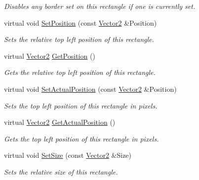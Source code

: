 \begin{DoxyCompactItemize}
\begin{DoxyCompactList}\small\item\em Disables any border set on this rectangle if one is currently set. \item\end{DoxyCompactList}\item 
virtual void \hyperlink{classphys_1_1UI_1_1Rectangle_a16fd918d53d0ae1f82af2574c0396b2c}{SetPosition} (const \hyperlink{classphys_1_1Vector2}{Vector2} \&Position)
\begin{DoxyCompactList}\small\item\em Sets the relative top left position of this rectangle. \item\end{DoxyCompactList}\item 
virtual \hyperlink{classphys_1_1Vector2}{Vector2} \hyperlink{classphys_1_1UI_1_1Rectangle_aa0e2d6170f0b2d5b1f915c705e7fca10}{GetPosition} ()
\begin{DoxyCompactList}\small\item\em Gets the relative top left position of this rectangle. \item\end{DoxyCompactList}\item 
virtual void \hyperlink{classphys_1_1UI_1_1Rectangle_a8a5af1cc3360196f793deb8a0db604e4}{SetActualPosition} (const \hyperlink{classphys_1_1Vector2}{Vector2} \&Position)
\begin{DoxyCompactList}\small\item\em Sets the top left position of this rectangle in pixels. \item\end{DoxyCompactList}\item 
virtual \hyperlink{classphys_1_1Vector2}{Vector2} \hyperlink{classphys_1_1UI_1_1Rectangle_a976f977ee23e805b4a193fc0f9e8392f}{GetActualPosition} ()
\begin{DoxyCompactList}\small\item\em Gets the top left position of this rectangle in pixels. \item\end{DoxyCompactList}\item 
virtual void \hyperlink{classphys_1_1UI_1_1Rectangle_a5fa81c05e32b454c313f25609a03c58f}{SetSize} (const \hyperlink{classphys_1_1Vector2}{Vector2} \&Size)
\begin{DoxyCompactList}\small\item\em Sets the relative size of this rectangle. \item\end{DoxyCompactList}\item 

\end{DoxyCompactItemize}
